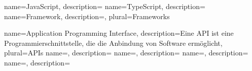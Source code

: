 
{
	name=JavaScript,
	description={}
}
{
	name=TypeScript,
	description={}
}
{
	name=Framework,
	description={},
	plural=Frameworks
}

{
	name=Application Programming Interface,
	description={Eine API ist eine Programmierschnittstelle, die die Anbindung von Software ermöglicht},
	plural=APIs
}
{
	name=,
	description={}
}
{
	name=,
	description={}
}
{
	name=,
	description={}
}
{
	name=,
	description={}
}
